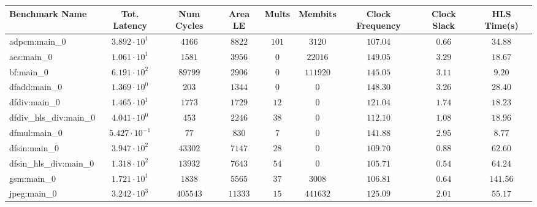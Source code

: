 \begin{tabular}{|l|c|c|c|c|c|c|c|c|}
\hline
Benchmark Name          & Tot. Latency            & Num Cycles & Area LE   & Mults   & Membits    & Clock Frequency & Clock Slack & HLS Time(s) \\
\hline
adpcm:main\_0           & $ 3.892 \cdot 10^{1}  $ & $ 4166   $ & $ 8822  $ & $ 101 $ & $ 3120   $ & $ 107.04      $ & $ 0.66    $ & $ 34.88   $ \\
aes:main\_0             & $ 1.061 \cdot 10^{1}  $ & $ 1581   $ & $ 3956  $ & $ 0   $ & $ 22016  $ & $ 149.05      $ & $ 3.29    $ & $ 18.67   $ \\
bf:main\_0              & $ 6.191 \cdot 10^{2}  $ & $ 89799  $ & $ 2906  $ & $ 0   $ & $ 111920 $ & $ 145.05      $ & $ 3.11    $ & $ 9.20    $ \\
dfadd:main\_0           & $ 1.369 \cdot 10^{0}  $ & $ 203    $ & $ 1344  $ & $ 0   $ & $ 0      $ & $ 148.30      $ & $ 3.26    $ & $ 28.40   $ \\
dfdiv:main\_0           & $ 1.465 \cdot 10^{1}  $ & $ 1773   $ & $ 1729  $ & $ 12  $ & $ 0      $ & $ 121.04      $ & $ 1.74    $ & $ 18.23   $ \\
dfdiv\_hls\_div:main\_0 & $ 4.041 \cdot 10^{0}  $ & $ 453    $ & $ 2246  $ & $ 38  $ & $ 0      $ & $ 112.10      $ & $ 1.08    $ & $ 18.96   $ \\
dfmul:main\_0           & $ 5.427 \cdot 10^{-1} $ & $ 77     $ & $ 830   $ & $ 7   $ & $ 0      $ & $ 141.88      $ & $ 2.95    $ & $ 8.77    $ \\
dfsin:main\_0           & $ 3.947 \cdot 10^{2}  $ & $ 43302  $ & $ 7147  $ & $ 28  $ & $ 0      $ & $ 109.70      $ & $ 0.88    $ & $ 62.60   $ \\
dfsin\_hls\_div:main\_0 & $ 1.318 \cdot 10^{2}  $ & $ 13932  $ & $ 7643  $ & $ 54  $ & $ 0      $ & $ 105.71      $ & $ 0.54    $ & $ 64.24   $ \\
gsm:main\_0             & $ 1.721 \cdot 10^{1}  $ & $ 1838   $ & $ 5565  $ & $ 37  $ & $ 3008   $ & $ 106.81      $ & $ 0.64    $ & $ 141.56  $ \\
jpeg:main\_0            & $ 3.242 \cdot 10^{3}  $ & $ 405543 $ & $ 11333 $ & $ 15  $ & $ 441632 $ & $ 125.09      $ & $ 2.01    $ & $ 55.17   $ \\

\end{tabular}
